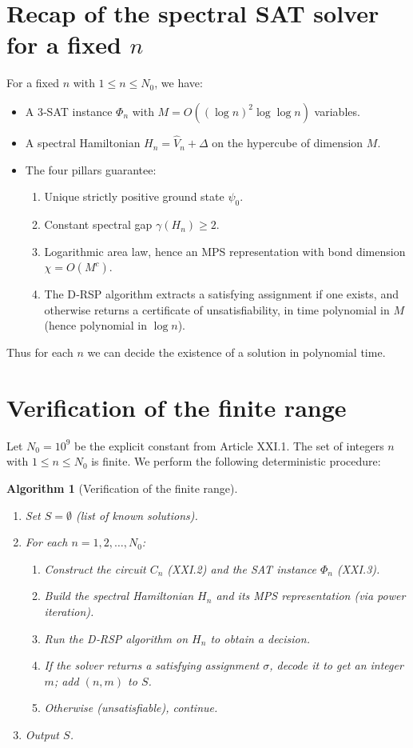 \documentclass[11pt,a4paper]{article}
\newtheorem{algorithm}{Algorithm}[section]
\begin{document}
\section{Recap of the spectral SAT solver for a fixed $n$}

For a fixed $n$ with $1\le n\le N_0$, we have:
\begin{itemize}
\item A 3‑SAT instance $\Phi_n$ with $M = O((\log n)^2 \log \log n)$ variables.
\item A spectral Hamiltonian $H_n = \hat{V}_n + \Delta$ on the hypercube of dimension $M$.
\item The four pillars guarantee:
  \begin{enumerate}
  \item Unique strictly positive ground state $\psi_0$.
  \item Constant spectral gap $\gamma(H_n) \ge 2$.
  \item Logarithmic area law, hence an MPS representation with bond dimension $\chi = O(M^c)$.
  \item The D‑RSP algorithm extracts a satisfying assignment if one exists, and otherwise returns a certificate of unsatisfiability, in time polynomial in $M$ (hence polynomial in $\log n$).
  \end{enumerate}
\end{itemize}
Thus for each $n$ we can decide the existence of a solution in polynomial time.

\section{Verification of the finite range}

Let $N_0 = 10^9$ be the explicit constant from Article XXI.1. The set of integers $n$ with $1\le n\le N_0$ is finite. We perform the following deterministic procedure:

\begin{algorithm}[Verification of the finite range]\label{alg:range}
\begin{enumerate}
\item Set $S = \emptyset$ (list of known solutions).
\item For each $n = 1,2,\dots, N_0$:
   \begin{enumerate}
   \item Construct the circuit $C_n$ (XXI.2) and the SAT instance $\Phi_n$ (XXI.3).
   \item Build the spectral Hamiltonian $H_n$ and its MPS representation (via power iteration).
   \item Run the D‑RSP algorithm on $H_n$ to obtain a decision.
   \item If the solver returns a satisfying assignment $\sigma$, decode it to get an integer $m$; add $(n,m)$ to $S$.
   \item Otherwise (unsatisfiable), continue.
   \end{enumerate}
\item Output $S$.
\end{enumerate}
\end{algorithm}
\end{document}
